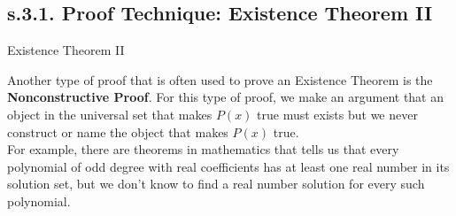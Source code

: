 \newpage
\subsection{s.3.1. Proof Technique: Existence Theorem II}

\begin{definition}
Existence Theorem II

Another type of proof that is often used to prove  an Existence Theorem is the {\bf Nonconstructive Proof}. For this type of proof, we make an argument that an object in the universal set that makes $P(x)$ true must exists but we never construct or name the object that makes $P(x)$ true. \\
For example, there are theorems in mathematics that tells us that every polynomial of odd degree with real coefficients has at least one real number in its solution set, but we don't know to find a real number solution for every such polynomial. 
\end{definition}

